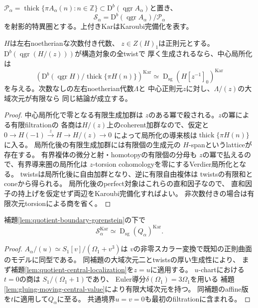 \newcommand{\SingCat}{\operatorname{D}_{\mathrm{sg}}}
\newcommand{\PerfCat}{\operatorname{Perf}}
\newcommand{\thickcat}{\operatorname{thick}}
\newcommand{\Kar}{\mathrm{Kar}}
\newcommand{\Db}{\mathrm D^b}
$\mathcal P_\alpha=\thickcat\{\pi A_\alpha(n):n\in\mathbb Z\}
\subset\Db(\operatorname{qgr}A_\alpha)$と置き、
\[
 \mathcal S_\alpha=
 \Db(\operatorname{qgr}A_\alpha)/\mathcal P_\alpha
\]
を射影的特異圏とする。上付き$\Kar$はKaroubi完備化を表す。

\begin{lemma}[中心元に沿う特異圏の局所化]
\label{lem:quotient-central-localization}
$H$は左右noetherianな次数付き代数、
$z\in Z(H)_1$は正則元とする。
$\Db(\operatorname{qgr}(H/(z)))$が構造対象の全twistで
厚く生成されるなら、中心局所化は
\[
 \left(\Db(\operatorname{qgr}H)/
       \thickcat\{\pi H(n)\}\right)^\Kar
   \simeq \SingCat(H[z^{-1}]_0)^\Kar
\]
を与える。次数なしの左右noetherian代数$\Lambda$と
中心正則元$z$に対し、$\Lambda/(z)$の大域次元が有限なら
同じ結論が成立する。
\end{lemma}
\begin{proof}
中心局所化で零となる有限生成加群は
$z$のある冪で殺される。$z$の冪による有限filtrationの
各商は$H/(z)$上のcoherent加群なので、仮定と
$0\to H(-1)\xrightarrow{z}H\to H/(z)\to0$
によって局所化の導来核は$\thickcat\{\pi H(n)\}$に入る。
局所化後の有限生成加群には有限個の生成元の
$H$-spanというlatticeが存在する。
有界複体の微分と射・homotopyの有限個の分母も
$z$の冪で払えるので、有界導来圏の局所化は
$z$-torsion cohomologyを零にするVerdier局所化となる。
twistsは局所化後に自由加群となり、逆に有限自由複体は
twistsの有限和とconeから得られる。
局所化後のperfect対象はこれらの直和因子なので、
直和因子の持上げを仮定せず両辺をKaroubi完備化すればよい。
非次数付きの場合は有限次元torsionによる商を省く。
\end{proof}

\begin{corollary}[二つの中心chartの除去]
\label{cor:quotient-two-chart}
補題\ref{lem:quotient-boundary-gorenstein}の下で
\[
 \mathcal S_\alpha^\Kar\simeq\SingCat(Q_\alpha)^\Kar .
\]
\end{corollary}
\begin{proof}
$A_\alpha/(u)\simeq
 S_1[v]/(\Omega_1+v^3)$は
$v$の非零スカラー変換で既知の正則曲面のモデルに同型である。
同補題の大域次元二とtwistsの厚い生成性により、
まず補題\ref{lem:quotient-central-localization}を$z=u$に適用する。
$u$-chartにおける$t=0$の商は
$S_1/(\Omega_1+1)$であり、
Euler導分$\delta(\Omega_1)=3\Omega_1$を用いる
補題\ref{lem:gluing-moving-central-value}により有限大域次元を持つ。
同補題のaffine版を$t$に適用して$Q_\alpha$に至る。
共通境界$u=v=0$も最初のfiltrationに含まれる。
\end{proof}

